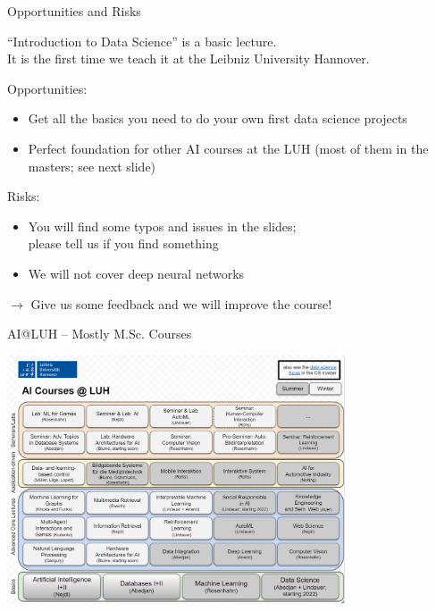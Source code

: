 \documentclass[aspectratio=169]{../latex_main/tntbeamer}  %
\begin{document}
\begin{frame}[c]{Opportunities and Risks}

``Introduction to Data Science'' is a basic lecture.\\ It is the first time we teach it at the Leibniz University Hannover.

\bigskip
\pause

Opportunities:
\begin{itemize}
  \item Get all the basics you need to do your own first data science projects
  \item Perfect foundation for other AI courses at the LUH (most of them in the masters; see next slide)
\end{itemize}

\medskip

Risks:
\begin{itemize}
  \item You will find some typos and issues in the slides;\\ please tell us if you find something
  \item We will not cover deep neural networks
\end{itemize}

\medskip
$\to$ Give us some feedback and we will improve the course!

\end{frame}
\begin{frame}[c]{AI@LUH -- Mostly M.Sc. Courses}

\centering
\vspace{-1.3cm}
\includegraphics[width=0.75\textwidth]{./figures/ai_luh.PNG}

\end{frame}
\end{document}

